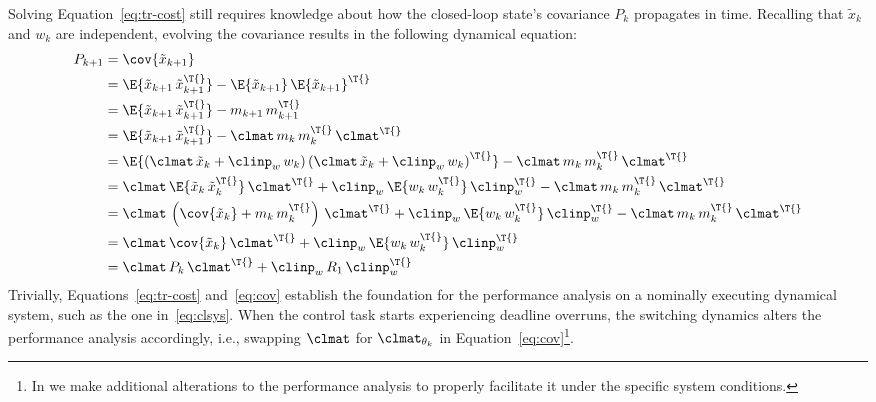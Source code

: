 Solving Equation~\eqref{eq:tr-cost} still requires knowledge about how the closed-loop state's covariance $P_k$ propagates in time.
Recalling that $\tilde{x}_k$ and $w_k$ are independent, evolving the covariance results in the following dynamical equation:
%
\begin{equation}%
    \label{eq:cov}%
    \begin{aligned}
        P_{k+1} &= \cov{\tilde{x}_{k+1}} \\
        &= \E{\tilde{x}_{k+1}\,\tilde{x}_{k+1}^\T{}} - \E{\tilde{x}_{k+1}}\,\E{\tilde{x}_{k+1}}^\T{} \\
        &= \E{\tilde{x}_{k+1}\,\tilde{x}_{k+1}^\T{}} - m_{k+1}\,m_{k+1}^\T{} \\
        &= \E{\tilde{x}_{k+1}\,\tilde{x}_{k+1}^\T{}} - \clmat\, m_{k}\,m_{k}^\T{}\,\clmat^\T{} \\
        &= \E{ \left( \clmat\,\tilde{x}_k + \clinp_w\, w_k \right)\left( \clmat\,\tilde{x}_k + \clinp_w\, w_k \right)^\T{} } - \clmat\, m_{k}\,m_{k}^\T{}\,\clmat^\T{} \\
        &= \clmat\,\E{ \tilde{x}_k\,\tilde{x}_k^\T{} }\,\clmat^\T{} + \clinp_w\,\E{ w_k\,w_k^\T{} }\,\clinp_w^\T{} - \clmat\, m_{k}\,m_{k}^\T{}\,\clmat^\T{} \\
        &= \clmat\,\left( \cov{\tilde{x}_k} + m_k\,m_k^\T{} \right)\,\clmat^\T{} + \clinp_w\,\E{ w_k\,w_k^\T{} }\,\clinp_w^\T{} - \clmat\, m_k\,m_{k}^\T{}\,\clmat^\T{} \\
        &= \clmat\,\cov{\tilde{x}_k}\,\clmat^\T{} + \clinp_w\,\E{ w_k\,w_k^\T{} }\,\clinp_w^\T{} \\
        &= \clmat\,P_k\,\clmat^\T{} + \clinp_w\,R_1\,\clinp_w^\T{}
    \end{aligned}
\end{equation}
%
Trivially, Equations~\eqref{eq:tr-cost} and~\eqref{eq:cov} establish the foundation for the performance analysis on a nominally executing dynamical system, such as the one in~\eqref{eq:clsys}.
When the control task starts experiencing deadline overruns, the switching dynamics alters the performance analysis accordingly, i.e., swapping $\clmat$ for $\clmat_{\theta_k}$ in Equation~\eqref{eq:cov}\footnote{In  we make additional alterations to the performance analysis to properly facilitate it under the specific system conditions.}.

